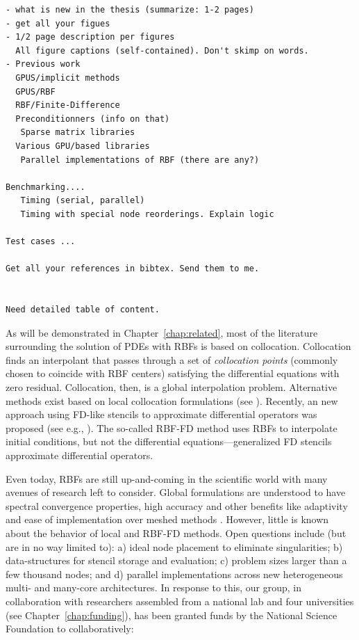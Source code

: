 \documentclass[11pt]{report}
\begin{document}
\begin{verbatim}
- what is new in the thesis (summarize: 1-2 pages)
- get all your figues
- 1/2 page description per figures
  All figure captions (self-contained). Don't skimp on words.
- Previous work
  GPUS/implicit methods
  GPUS/RBF
  RBF/Finite-Difference
  Preconditionners (info on that)
   Sparse matrix libraries
  Various GPU/based libraries
   Parallel implementations of RBF (there are any?)

Benchmarking....
   Timing (serial, parallel)
   Timing with special node reorderings. Explain logic

Test cases ...

Get all your references in bibtex. Send them to me.


Need detailed table of content.
 \end{verbatim}		






As will be demonstrated in Chapter~\ref{chap:related}, most of the literature surrounding the solution of PDEs with RBFs is based on 
collocation. Collocation finds an interpolant that passes through a set of \emph{collocation points} (commonly chosen to coincide with RBF centers) satisfying the differential equations with zero residual. Collocation, then, is a global interpolation problem. Alternative methods exist based on local collocation formulations (see \cite{Sarler:2006, Vertnik:2006,Stevens:2008a, Stevens:2009a, Stevens:2009b}). Recently, an new approach using FD-like stencils to approximate 
differential operators was proposed  (see e.g., \cite{Wright:2003, Wright:2006, Shu:2003, Chandhini:2007}). The so-called RBF-FD method uses RBFs to interpolate initial conditions, but not the differential equations---generalized FD stencils approximate differential operators. 

Even today, RBFs are still up-and-coming in the scientific world with many avenues of research left to consider. Global formulations are understood to have spectral convergence properties, high accuracy and other benefits like adaptivity and ease of implementation over meshed methods \cite{Fasshauer:2007}. However, little is known about the behavior of local and RBF-FD methods. Open questions include (but are in no way limited to): a) ideal node placement to eliminate singularities; b) data-structures for stencil storage and evaluation; c) problem sizes larger than a few thousand nodes; and d) parallel implementations across new heterogeneous multi- and many-core architectures. In response to this, our group, in collaboration with researchers assembled from a national lab and four universities (see Chapter~\ref{chap:funding}), has been granted funds by the National Science Foundation to collaboratively:
\end{document}
